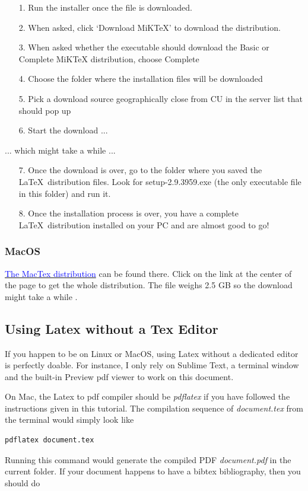 \begin{itemize}
\item[1.] Run the installer once the file is downloaded.
\item[2.] When asked, click ‘Download MiKTeX’ to download the distribution.
\item[3.] When asked whether the executable should download the Basic or Complete MiKTeX distribution, choose Complete
\item[4.] Choose the folder where the installation files will be downloaded
\item[5.] Pick a download source geographically close from CU in the server list that should pop up
\item[6.] Start the download ...
\end{itemize}
... which might take a while ...
\begin{itemize}
\item[7.] Once the download is over, go to the folder where you saved the \LaTeX\ distribution files. Look for setup-2.9.3959.exe (the only executable file in this folder) and run it.
\item[8.] Once the installation process is over, you have a complete \LaTeX\ distribution installed on your PC and are almost good to go!
\end{itemize}

\subsubsection{MacOS}
\href{https://tug.org/mactex/mactex-download.html}{\textcolor{blue}{The MacTex distribution}} can be found there. Click on the link at the center of the page to get the whole distribution. The file weighs 2.5 GB so the download might take a while .


\subsection{Using Latex without a Tex Editor}
If you happen to be on Linux or MacOS, using Latex without a dedicated editor is perfectly doable. For instance, I only rely on Sublime Text, a terminal window and the built-in Preview pdf viewer to work on this document.

On Mac, the Latex to pdf compiler should be \textit{pdflatex} if you have followed the instructions given in this tutorial. The compilation sequence of \textit{document.tex} from the terminal would simply look like

\begin{lstlisting}[language = {}]
pdflatex document.tex
\end{lstlisting}
Running this command would generate the compiled PDF \textit{document.pdf} in the current folder. If your document happens to have a bibtex bibliography, then you should do 


